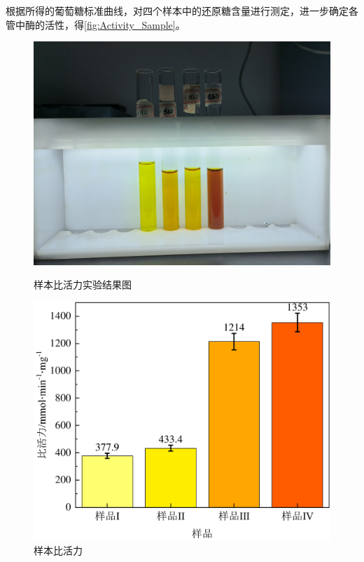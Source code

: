 根据所得的葡萄糖标准曲线，对四个样本中的还原糖含量进行测定，进一步确定各管中酶的活性，得\autoref{fig:Activity_Sample}。

\begin{figure}[H]
    \begin{minipage}[t]{0.49\textwidth}
    \includegraphics[width = \textwidth]{figure/1124/Activity_Sample.jpg}
    \caption{样本比活力实验结果图}
    \label{fig:Activity_Sample_fig}
    \end{minipage}
    \begin{minipage}[t]{0.48\textwidth}
    \includegraphics[width = \textwidth]{figure/1124/Activity_Sample.pdf}
    \caption{样本比活力}
    \label{fig:Activity_Sample}
    \end{minipage}
\end{figure}

